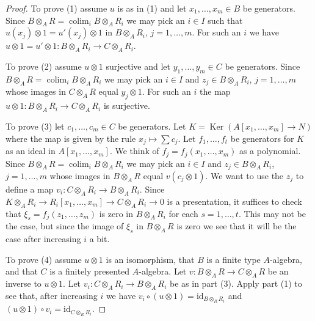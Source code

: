 \documentclass{amsart}
\theoremstyle{plain}
\theoremstyle{definition}
\theoremstyle{remark}
\numberwithin{equation}{subsection}
\def\colim{\mathop{\mathrm{colim}}\nolimits}
\def\Ker{\mathop{\mathrm{Ker}}}
\begin{document}
\begin{proof}
To prove (1) assume $u$ is as in (1) and
let $x_1, \ldots, x_m \in B$ be generators. Since
$B \otimes_A R = \colim_i B \otimes_A R_i$
we may pick an $i \in I$ such that $u(x_j) \otimes 1 = u'(x_j) \otimes 1$
in $B \otimes_A R_i$, $j = 1, \ldots, m$.
For such an $i$ we have
$u \otimes 1 = u' \otimes 1 : B \otimes_A R_i \to C \otimes_A R_i$.

\medskip\noindent
To prove (2) assume $u \otimes 1$ surjective and
let $y_1, \ldots, y_m \in C$ be generators. Since
$B \otimes_A R = \colim_i B \otimes_A R_i$
we may pick an $i \in I$ and $z_j \in B \otimes_A R_i$, $j = 1, \ldots, m$
whose images in $C \otimes_A R$ equal $y_j \otimes 1$.
For such an $i$ the map $u \otimes 1 : B \otimes_A R_i \to C \otimes_A R_i$
is surjective.

\medskip\noindent
To prove (3) let $c_1, \ldots, c_m \in C$ be generators. Let
$K = \Ker(A[x_1, \ldots, x_m] \to N)$ where the map is given by
the rule $x_j \mapsto \sum c_j$. Let $f_1, \ldots, f_t$
be generators for $K$ as an ideal in $A[x_1, \ldots, x_m]$.
We think of $f_j = f_j(x_1, \ldots, x_m)$ as a polynomial.
Since $B \otimes_A R = \colim_i B \otimes_A R_i$
we may pick an $i \in I$ and $z_j \in B \otimes_A R_i$, $j = 1, \ldots, m$
whose images in $B \otimes_A R$ equal $v(c_j \otimes 1)$.
We want to use the $z_j$ to define a map
$v_i : C \otimes_A R_i \to B \otimes_A R_i$.
Since $K \otimes_A R_i \to R_i[x_1, \ldots, x_m] \to C \otimes_A R_i \to 0$
is a presentation, it suffices to check that
$\xi_s = f_j(z_1, \ldots, z_m)$ is
zero in $B \otimes_A R_i$ for each $s = 1, \ldots, t$. This may not
be the case, but since the image of $\xi_s$ in $B \otimes_A R$ is zero
we see that it will be the case after increasing $i$ a bit.

\medskip\noindent
To prove (4) assume $u \otimes 1$ is an isomorphism, that
$B$ is a finite type $A$-algebra, and that $C$ is a finitely presented
$A$-algebra. Let $v : B \otimes_A R \to C \otimes_A R$ be an inverse to
$u \otimes 1$. Let $v_i : C \otimes_A R_i \to B \otimes_A R_i$ be as
in part (3). Apply part (1) to see that, after increasing $i$ we have
$v_i \circ (u \otimes 1) = \text{id}_{B \otimes_R R_i}$ and
$(u \otimes 1) \circ v_i = \text{id}_{C \otimes_R R_i}$.
\end{proof}
\end{document}
